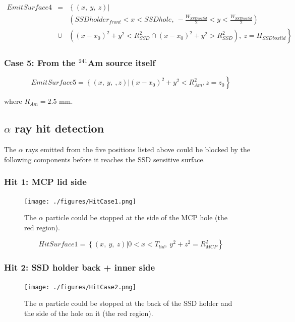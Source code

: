 \documentclass{article}
\begin{document}
\begin{eqnarray*}
	EmitSurface4 & = & \left\{ (x,~y,~z) \right| \\
	&  & \left( SSDholder_{front} < x < SSDhole,~-\frac{W_{SSDboxlid}}{2} < y < \frac{W_{SSDboxlid}}{2} \right) \\
	& \cup & \left. \left( (x-x_0)^2+y^2 < R_{SSD}^2 \cap (x-x_0)^2+y^2 > R_{SSD}^2 \right),~z = H_{SSDboxlid} \right\}
\end{eqnarray*}


\subsubsection{Case 5: From the ${}^{241}$Am source itself}

$$
EmitSurface5 = \left\{(x,~y,~,z) \right| \left. (x-x_0)^2 + y^2 < R_{Am}^2, z = z_0 \right\}
$$

where $R_{Am} = 2.5$ mm.



\subsection{$\alpha$ ray hit detection}

The $\alpha$ rays emitted from the five positions listed above could be blocked by the following components before it reaches the SSD sensitive surface. 


\subsubsection{Hit 1: MCP lid side}

\begin{figure}[H]
  \begin{center}
    \texttt{[image: ./figures/HitCase1.png]}
	  \caption{The $\alpha$ particle could be stopped at the side of the MCP hole (the red region).}
    \label{fig:HitCase1}
  \end{center}
\end{figure}

$$
HitSurface1 = \left\{(x,~y,~z) \right| \left. 0 < x < T_{lid},~ y^2+z^2 = R_{MCP}^2 \right\}
$$

\subsubsection{Hit 2: SSD holder back + inner side}

\begin{figure}[H]
  \begin{center}
    \texttt{[image: ./figures/HitCase2.png]}
	  \caption{The $\alpha$ particle could be stopped at the back of the SSD holder and the side of the hole on it (the red region).}
    \label{fig:HitCase2}
  \end{center}
\end{figure}
\end{document}
